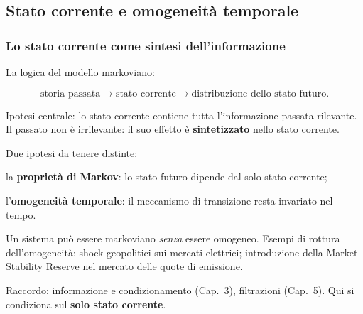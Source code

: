

\subsection{Stato corrente e omogeneit\`{a} temporale}%

\begin{frame}%
%

\frametitle{Lo stato corrente come sintesi dell'informazione}%
%

%


La logica del modello markoviano:%

\[
\text{storia passata} \longrightarrow\text{stato corrente} \longrightarrow
\text{distribuzione dello stato futuro}.
\]


Ipotesi centrale: lo stato corrente contiene tutta l'informazione passata
rilevante. Il passato non \`{e} irrilevante: il suo effetto \`{e}
\textbf{sintetizzato} nello stato corrente.

\medskip

Due ipotesi da tenere distinte:

\begin{stepitemize}
\item la \textbf{propriet\`{a} di Markov}: lo stato futuro dipende dal solo
stato corrente;

\item l'\textbf{omogeneit\`{a} temporale}: il meccanismo di transizione resta
invariato nel tempo.
\end{stepitemize}

\medskip

Un sistema pu\`{o} essere markoviano \emph{senza} essere omogeneo. Esempi di
rottura dell'omogeneit\`{a}: shock geopolitici sui mercati elettrici;
introduzione della Market Stability Reserve nel mercato delle quote di emissione.

\medskip

\begin{center}
{\small Raccordo: informazione e condizionamento (Cap.~3), filtrazioni
(Cap.~5). Qui si condiziona sul \textbf{solo stato corrente}.}
\end{center}

%

\transboxout
\end{frame}%


